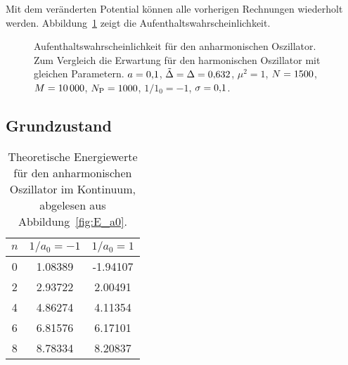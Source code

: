 Mit dem veränderten Potential können alle vorherigen Rechnungen wiederholt
werden. Abbildung~\ref{fig:histogram_gauss} zeigt die
Aufenthaltswahrscheinlichkeit.

\begin{figure}[htbp]
    \centering
    \caption{%
        Aufenthaltswahrscheinlichkeit für den anharmonischen Oszillator. Zum
        Vergleich die Erwartung für den harmonischen Oszillator mit gleichen
        Parametern. $a = \num{0.1}$, $\tilde \Delta = \Delta =
        \num{0.632}$, $\mu^2 = \num{1}$, $N = \num{1500}$,
        $M = \num{10000}$, $N_\text P = \num{1000}$, $1/1_0 =
        \num{-1}$, $\sigma = \num{0.1}$.
    }
    \label{fig:histogram_gauss}
\end{figure}

\subsection{Grundzustand}

\begin{table}[htbp]
    \centering
    \begin{tabular}{SSS}
        {$n$} & {$1/a_0 = -1$} & {$1/a_0 = 1$} \\
         & 1.08389 & -1.94107 \\
        2 & 2.93722 & 2.00491 \\
        4 & 4.86274 & 4.11354 \\
        6 & 6.81576 & 6.17101 \\
        8 & 8.78334 & 8.20837
    \end{tabular}
    \caption{%
        Theoretische Energiewerte für den anharmonischen Oszillator im
        Kontinuum, abgelesen aus Abbildung~\ref{fig:E_a0}.
    }
    \label{tab:E_a0}
\end{table}

